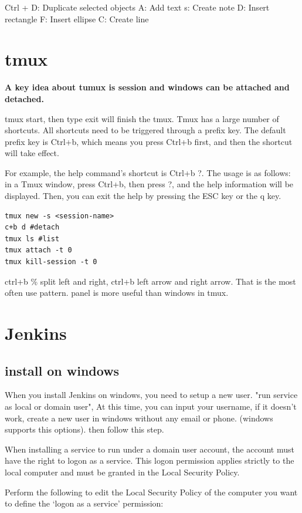 \documentclass[paper=8.5in:11in, twoside, 12pt, pagesize=pdftex]{book}
\begin{document}
Ctrl + D: Duplicate selected objects
A: Add text
s: Create note
D: Insert rectangle
F: Insert ellipse
C: Create line



\section{tmux}
\textbf{A key idea about tumux is session and windows can be attached and detached.}

tmux start, then type exit will finish the tmux.
Tmux has a large number of shortcuts. All shortcuts need to be triggered through a prefix key. The default prefix key is Ctrl+b, which means you press Ctrl+b first, and then the shortcut will take effect.

For example, the help command's shortcut is Ctrl+b ?. The usage is as follows: in a Tmux window, press Ctrl+b, then press ?, and the help information will be displayed. Then, you can exit the help by pressing the ESC key or the q key.
\begin{lstlisting}
tmux new -s <session-name>
c+b d #detach 
tmux ls #list
tmux attach -t 0
tmux kill-session -t 0
\end{lstlisting}


ctrl+b  \% split left and right, ctrl+b left arrow and right arrow. That is the most often use pattern.  panel is more useful than windows in tmux. 


\section{Jenkins}

\subsection{install on windows}

When you install Jenkins on windows, you need to setup a new user. 
"run service as local or domain user", At this time, you can input your username, if it doesn't work, create a new user in windows without any email or phone. (windows supports this options). then follow this step. 


When installing a service to run under a domain user account, the account must have the right to logon as a service. This logon permission applies strictly to the local computer and must be granted in the Local Security Policy.

Perform the following to edit the Local Security Policy of the computer you want to define the ‘logon as a service’ permission:
\end{document}
